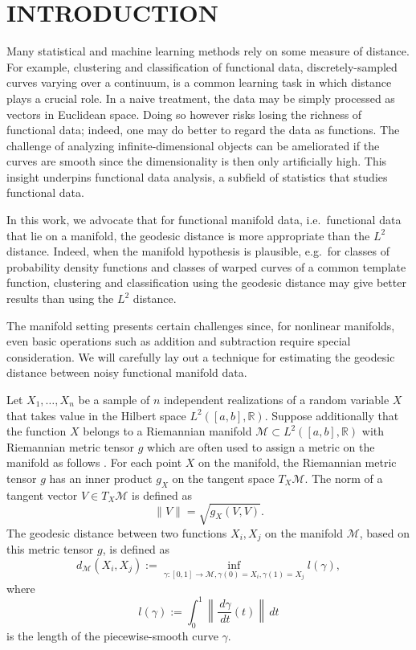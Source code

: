 \newcommand {\To}{\rightarrow}
\newcommand {\TO}{\Rightarrow}
\newcommand {\R}{\mathbb{R}}
\newcommand {\Prob}{\mathbb{P}}
\newcommand{\E}{\mathbb{E}}
\newcommand {\cov}{\textrm{Cov}}
\newcommand {\var}{\textrm{Var}}
\newcommand {\1}{\textrm{\textbf{1}}}
\newcommand{\M}{\mathcal{M}}


\section{INTRODUCTION}\label{introduction}

Many statistical and machine learning methods rely on some measure of
distance. For example, clustering and classification of functional data,
discretely-sampled curves varying over a continuum, is a common learning
task in which distance plays a crucial role. In a naive treatment, the
data may be simply processed as vectors in Euclidean space. Doing so
however risks losing the richness of functional data; indeed, one may do
better to regard the data as functions. The challenge of analyzing
infinite-dimensional objects can be ameliorated if the curves are smooth
since the dimensionality is then only artificially high. This insight
underpins functional data analysis, a subfield of statistics that
studies functional data.

In this work, we advocate that for functional manifold data,
i.e.~functional data that lie on a manifold, the geodesic distance is
more appropriate than the \(L^2\) distance. Indeed, when the manifold
hypothesis is plausible, e.g.~for classes of probability density
functions and classes of warped curves of a common template function,
clustering and classification using the geodesic distance may give
better results than using the \(L^2\) distance.

The manifold setting presents certain challenges since, for nonlinear
manifolds, even basic operations such as addition and subtraction
require special consideration. We will carefully lay out a technique for
estimating the geodesic distance between noisy functional manifold data.

Let \(X_1,\ldots,X_n\) be a sample of \(n\) independent realizations of
a random variable \(X\) that takes value in the Hilbert space
\(L^2([a,b],\R)\). Suppose additionally that the function \(X\) belongs
to a Riemannian manifold \(\M \subset L^2([a,b],\R)\) with Riemannian
metric tensor \(g\) which are often used to assign a metric on the
manifold as follows \cite{Lin2014}. For each point \(X\) on the
manifold, the Riemannian metric tensor \(g\) has an inner product
\(g_X\) on the tangent space \(T_X \M\). The norm of a tangent vector
\(V \in T_X \M\) is defined as \[\|V\| = \sqrt{g_X(V,V)}.\] The geodesic
distance between two functions \(X_i,X_j\) on the manifold \(\M\), based
on this metric tensor \(g\), is defined as
\[ d_{\M}(X_i,X_j):=\inf_{\gamma:[0,1] \to \M, \gamma(0) = X_i, \gamma(1) = X_j} l(\gamma),\]
where
\[ l(\gamma) := \int_0^1 \left\| \frac{\,d\gamma}{\,d t}(t) \right\| \,dt\]
is the length of the piecewise-smooth curve \(\gamma\).

